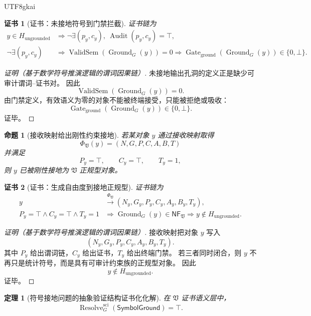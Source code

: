 \documentclass[12pt]{article}
\newtheorem{theorem}{定理}[section]
\newtheorem{proposition}{命题}[section]
\newtheorem{Certificate}{证书}[section]
\newcommand{\Vsys}{\mathfrak V}
\newcommand{\NF}{\mathsf{NF}}
\newcommand{\CertTuple}{(N,G,P,C,A,B,T)}
\DeclareMathOperator{\Audit}{Audit}
\DeclareMathOperator{\Resolve}{Resolve}
\DeclareMathOperator{\Gate}{Gate}
\DeclareMathOperator{\ValidSem}{ValidSem}
\DeclareMathOperator{\Ground}{Ground}
\begin{document}
\begin{CJK*}{UTF8}{gkai}
\begin{Certificate}[证书：未接地符号到门禁拦截]
\label{cert:tex59-ungrounded-blocked}
证书链为
\[
  \begin{aligned}
  y\in H_{\mathrm{ungrounded}}
  &\Longrightarrow
  \neg\exists(p_y,c_y),\ \Audit(p_y,c_y)=\top,\\
  \neg\exists(p_y,c_y)
  &\Longrightarrow
  \ValidSem(\Ground_G(y))=0
  \Longrightarrow
  \Gate_{\mathrm{ground}}(\Ground_G(y))\in\{0,\bot\}.
  \end{aligned}
\]
\end{Certificate}

\begin{proof}[证明（基于数学符号推演逻辑的谓词因果链）]
未接地输出孔洞的定义正是缺少可审计谓词--证书对。
因此
\[
  \ValidSem(\Ground_G(y))=0.
\]
由门禁定义，有效语义为零的对象不能被终端接受，只能被拒绝或吸收：
\[
  \Gate_{\mathrm{ground}}(\Ground_G(y))\in\{0,\bot\}.
\]
证毕。
\end{proof}

\begin{proposition}[接收映射给出刚性约束接地]
\label{prop:tex59-seven-grounding}
若某对象 \(y\) 通过接收映射取得
\[
  \Phi_{\Vsys}(y)=\CertTuple
\]
并满足
\[
  P_y=\top,\qquad C_y=\top,\qquad T_y=1,
\]
则 \(y\) 已被刚性接地为 \(\Vsys\) 正规型对象。
\end{proposition}

\begin{Certificate}[证书：生成自由度到接地正规型]
\label{cert:tex59-seven-grounding}
证书链为
\[
  \begin{aligned}
  y
  &\xrightarrow{\Phi_{\Vsys}}
  (N_y,G_y,P_y,C_y,A_y,B_y,T_y),\\
  P_y=\top\wedge C_y=\top\wedge T_y=1
  &\Longrightarrow
  \Ground_G(y)\in\NF_{\Vsys}
  \Longrightarrow
  y\notin H_{\mathrm{ungrounded}}.
  \end{aligned}
\]
\end{Certificate}

\begin{proof}[证明（基于数学符号推演逻辑的谓词因果链）]
接收映射把对象 \(y\) 写入
\[
  (N_y,G_y,P_y,C_y,A_y,B_y,T_y).
\]
其中 \(P_y\) 给出谓词链，\(C_y\) 给出证书，\(T_y\) 给出终端门禁。
若三者同时闭合，则 \(y\) 不再只是统计符号，而是具有可审计约束族的正规型对象。
因此
\[
  y\notin H_{\mathrm{ungrounded}}.
\]
证毕。
\end{proof}

\begin{theorem}[符号接地问题的抽象验证结构证书化化解]
\label{thm:tex59-symbol-ground-resolution}
在 \(\Vsys\) 证书语义层中，
\[
  \Resolve_G^{\mathrm{sci}}(\mathsf{SymbolGround})=\top.
\]
\end{theorem}


\end{CJK*}
\end{document}
